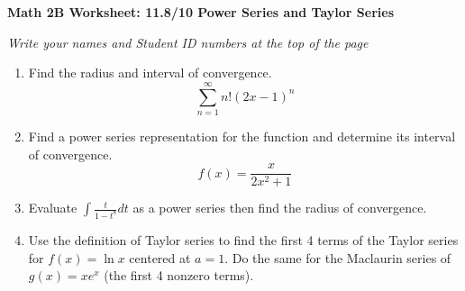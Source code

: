 \documentclass[12pt,fleqn]{article}
\begin{document}
\begin{center}
	\textbf{Math 2B Worksheet: 11.8/10 Power Series and Taylor Series}
\end{center}

\emph{Write your names and Student ID numbers at the top of the page}


\begin{enumerate}
\item Find the radius and interval of convergence.
\[\sum_{n=1}^\infty n!(2x-1)^n\]

\vfill

\item Find a power series representation for the function and determine its interval of convergence.
\[f(x)=\frac{x}{2x^2+1}\]

\vfill


\newpage
\item Evaluate $\displaystyle\int\frac{t}{1-t^8}dt$ as a power series then find the radius of convergence.\vfill



\item Use the definition of Taylor series to find the first 4 terms of the Taylor series for $f(x)=\ln x$ centered at $a=1$.  Do the same for the Maclaurin series of $g(x)=xe^x$ (the first 4 nonzero terms).\vfill





\end{enumerate}
\end{document}
